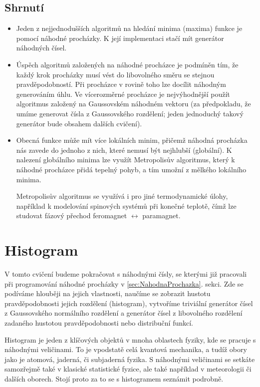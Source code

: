 \documentclass[a4paper,11pt,twoside]{article}
\theoremstyle{red}
\theoremstyle{green}
\begin{document}
\subsection{Shrnutí}
    \begin{itemize}
        \item 
            Jeden z nejjednodušších algoritmů na hledání minima (maxima) funkce je pomocí náhodné procházky.
            K její implementaci stačí mít generátor náhodných čísel.

        \item 
            Úspěch algoritmů založených na náhodné procházce je podmíněn tím, že každý krok procházky musí vést do libovolného směru se stejnou pravděpodobností.
            Při procházce v rovině toho lze docílit náhodným generováním úhlu.
            Ve vícerozměrné procházce je nejvýhodnější použít algoritmus založený na Gaussovském náhodném vektoru (za předpokladu, že umíme generovat čísla z Gaussovského rozdělení; jeden jednoduchý takový generátor bude obsahem dalších cvičení).   
        
        \item 
            Obecná funkce může mít více lokálních minim, přičemž náhodná procházka nás zavede do jednoho z nich, které nemusí být nejhlubší (globální).
            K nalezení globálního minima lze využít Metropolisův algoritmus, který k náhodné procházce přidá tepelný pohyb, a tím umožní  z mělkého lokálního minima.  

            Metropolisův algoritmus se využívá i pro jiné termodynamické úlohy, například k modelování spinových systémů při konečné teplotě, čímž lze studovat fázový přechod feromagnet $\leftrightarrow$ paramagnet.
    \end{itemize}


\section{Histogram}
    V tomto cvičení budeme pokračovat s náhodnými čísly, se kterými již pracovali při programování náhodné procházky v \ref{sec:NahodnaProchazka}. sekci.
    Zde se podíváme hlouběji na jejich vlastnosti, naučíme se zobrazit hustotu pravděpodobnosti jejich rozdělení (histogram), vytvoříme triviální generátor čísel z Gaussovského normálního rozdělení a generátor čísel z libovolného rozdělení zadaného hustotou pravděpodobnosti nebo distribuční funkcí.
       
    Histogram je jeden z klíčových objektů v mnoha oblastech fyziky, kde se pracuje s náhodnými veličinami.
    To je vpodstatě celá kvantová mechanika, a tudíž obory jako je atomová, jaderná, či subjaderná fyzika.
    S náhodnými veličinami se setkáte samozřejmě také v klasické statistické fyzice, ale také například v meteorologii či dalších oborech.
    Stojí proto za to se s histogramem seznámit podrobně.
\end{document}
